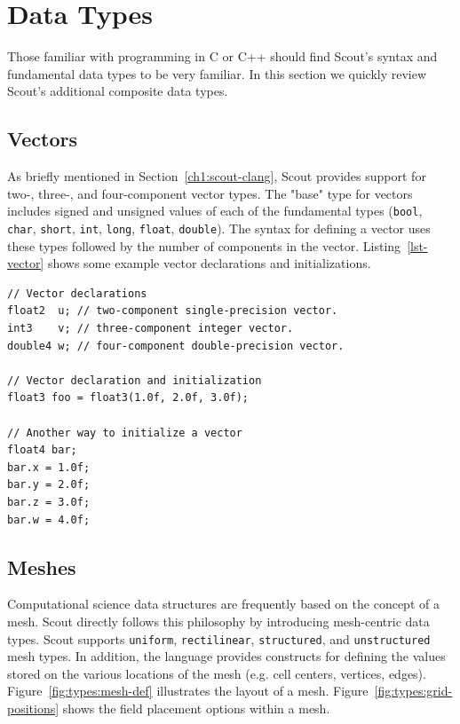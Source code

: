 \let\clearforchapter\par %


\chapter{Data Types}
\label{ch:datatypes}


Those familiar with programming in C or C++ should find Scout's syntax and fundamental data 
types to be very familiar.  In this section we quickly review Scout's additional composite data types.

\section{Vectors}
\label{ch:vectors}

As briefly mentioned in Section~\ref{ch1:scout-clang}, Scout provides support for two-, three-, 
and four-component vector types.  The "base" type for vectors includes signed and unsigned 
values of each of the fundamental types (\texttt{bool}, \texttt{char}, \texttt{short}, 
\texttt{int}, \texttt{long}, \texttt{float}, \texttt{double}).  The syntax for defining a 
vector uses these types followed by the number of components in the vector. Listing~\ref{lst-vector} 
shows some example vector declarations and initializations.

\par\bigskip
\begin{lstlisting}[float=h,label=lst-vector,
    caption={Vector declarations and initialization.}]
// Vector declarations
float2  u; // two-component single-precision vector.
int3    v; // three-component integer vector.
double4 w; // four-component double-precision vector.

// Vector declaration and initialization
float3 foo = float3(1.0f, 2.0f, 3.0f);

// Another way to initialize a vector
float4 bar;
bar.x = 1.0f;
bar.y = 2.0f;
bar.z = 3.0f;
bar.w = 4.0f;
\end{lstlisting}
\par\bigskip\noindent

\section{Meshes}
\label{ch:meshes}

Computational science data structures are frequently based on the concept of a mesh.
Scout directly follows this philosophy by introducing mesh-centric data types.  Scout supports 
\texttt{uniform}, \texttt{rectilinear}, \texttt{structured}, and \texttt{unstructured} mesh types.  
In addition, the language 
provides constructs for defining the values stored on the various locations of the mesh (e.g.
cell centers, vertices, edges).  Figure~\ref{fig:types:mesh-def} illustrates the layout of a mesh.
Figure~\ref{fig:types:grid-positions} shows the field placement options within a mesh.

